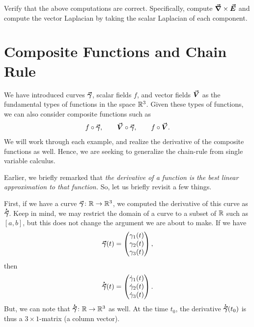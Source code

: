                \begin{exercise}
               Verify that the above computations are correct. Specifically, compute $\boldsymbol{\vec{\nabla}} \times \boldsymbol{\vec{E}}$ and compute the vector Laplacian by taking the scalar Laplacian of each component.
               \end{exercise}
              
       
       \section{Composite Functions and Chain Rule}
       
       We have introduced curves $\boldsymbol{\vec{\gamma}}$, scalar fields $f$, and vector fields $\boldsymbol{\vec{V}}$ as the fundamental types of functions in the space $\mathbb{R}^3$.  Given these types of functions, we can also consider composite functions such as
       \[
       f\circ \boldsymbol{\vec{\gamma}}, \qquad \boldsymbol{\vec{V}} \circ \boldsymbol{\vec{\gamma}}, \qquad f \circ \boldsymbol{\vec{V}}.
       \]
     	We will work through each example, and realize the derivative of the composite functions as well. Hence, we are seeking to generalize the chain-rule from single variable calculus.
     	
     	Earlier, we briefly remarked that \emph{the derivative of a function is the best linear approximation to that function.} So, let us briefly revisit a few things.
     	
     	First, if we have a curve $\boldsymbol{\vec{\gamma}} \colon \mathbb{R} \to \mathbb{R}^3$, we computed the derivative of this curve as $\boldsymbol{\dot{\vec{\gamma}}}$. Keep in mind, we may restrict the domain of a curve to a subset of $\mathbb{R}$ such as $[a,b]$, but this does not change the argument we are about to make.  If we have
     	\[
     	\boldsymbol{\vec{\gamma}}(t) = \begin{pmatrix} \gamma_1(t) \\ \gamma_2(t) \\ \gamma_3(t) \end{pmatrix},
     	\]
     	then
     	\[
     	\boldsymbol{\dot{\vec{\gamma}}}(t) = \begin{pmatrix} \dot{\gamma}_1(t) \\ \dot{\gamma}_2(t) \\ \dot{\gamma}_3(t) \end{pmatrix}.
     	\]
     	But, we can note that $\boldsymbol{\dot{\vec{\gamma}}} \colon \mathbb{R} \to \mathbb{R}^3$ as well.  At the time $t_0$, the derivative $\boldsymbol{\dot{\vec{\gamma}}}(t_0)$ is thus a $3\times 1$-matrix (a column vector).  
     	
